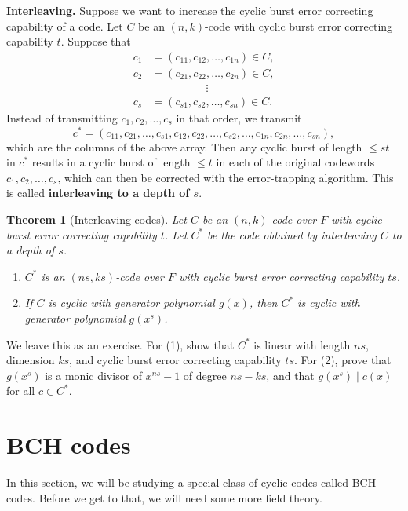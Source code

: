 \documentclass[10pt]{article}
\makeatletter
\theoremstyle{newstyle}
\newtheorem{thm}{Theorem}[subsection]
\newenvironment{pf}[1][\proofname]{\par
  \pushQED{\qed}%
  \normalfont \topsep0\p@\relax
  \trivlist
  \item[\hskip\labelsep\scshape
  #1\@addpunct{.}]\ignorespaces
}{%
  \popQED\endtrivlist\@endpefalse
}
\makeatother
\begin{document}
{\bf Interleaving.} Suppose we want to increase the cyclic burst error correcting capability of a code. 
Let $C$ be an $(n, k)$-code with cyclic burst error correcting capability $t$. Suppose that 
\begin{align*}
    c_1 &= (c_{11}, c_{12}, \dots, c_{1n}) \in C, \\
    c_2 &= (c_{21}, c_{22}, \dots, c_{2n}) \in C, \\
    & \qquad\qquad\quad \vdots \\
    c_s &= (c_{s1}, c_{s2}, \dots, c_{sn}) \in C.
\end{align*}
Instead of transmitting $c_1, c_2, \dots, c_s$ in that order, we transmit 
\[ c^* = (c_{11}, c_{21}, \dots, c_{s1}, c_{12}, c_{22}, \dots, c_{s2}, \dots, c_{1n}, c_{2n}, 
\dots, c_{sn}), \]
which are the columns of the above array. Then any cyclic burst of length $\leq st$ in 
$c^*$ results in a cyclic burst of length $\leq t$ in each of the original codewords 
$c_1, c_2, \dots, c_s$, which can then be corrected with the error-trapping algorithm. 
This is called {\bf interleaving to a depth of $s$}. 

\begin{thm}[Interleaving codes]
Let $C$ be an $(n, k)$-code over $F$ with cyclic burst error correcting capability $t$. 
Let $C^*$ be the code obtained by interleaving $C$ to a depth of $s$. 
\begin{enumerate}[(1)]
    \item $C^*$ is an $(ns, ks)$-code over $F$ with cyclic burst error correcting capability $ts$. 
    \item If $C$ is cyclic with generator polynomial $g(x)$, then $C^*$ is cyclic with 
    generator polynomial $g(x^s)$. 
\end{enumerate}
\end{thm}
\begin{pf}
We leave this as an exercise. For (1), show that $C^*$ is linear with length $ns$, dimension $ks$, and 
cyclic burst error correcting capability $ts$. For (2), prove that $g(x^s)$ is a monic 
divisor of $x^{ns}-1$ of degree $ns-ks$, and that $g(x^s) \mid c(x)$ for all $c \in C^*$. 
\end{pf}

\newpage 
\section{BCH codes}

In this section, we will be studying a special class of cyclic codes called BCH codes. Before we get 
to that, we will need some more field theory.
\end{document}
